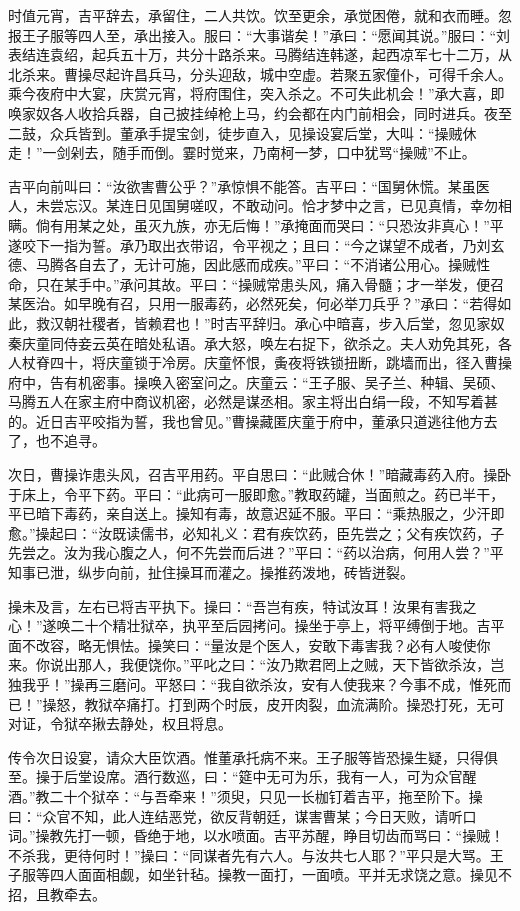 时值元宵，吉平辞去，承留住，二人共饮。饮至更余，承觉困倦，就和衣而睡。忽报王子服等四人至，承出接入。服曰：“大事谐矣！”承曰：“愿闻其说。”服曰：“刘表结连袁绍，起兵五十万，共分十路杀来。马腾结连韩遂，起西凉军七十二万，从北杀来。曹操尽起许昌兵马，分头迎敌，城中空虚。若聚五家僮仆，可得千余人。乘今夜府中大宴，庆赏元宵，将府围住，突入杀之。不可失此机会！”承大喜，即唤家奴各人收拾兵器，自己披挂绰枪上马，约会都在内门前相会，同时进兵。夜至二鼓，众兵皆到。董承手提宝剑，徒步直入，见操设宴后堂，大叫：“操贼休走！”一剑剁去，随手而倒。霎时觉来，乃南柯一梦，口中犹骂“操贼”不止。

吉平向前叫曰：“汝欲害曹公乎？”承惊惧不能答。吉平曰：“国舅休慌。某虽医人，未尝忘汉。某连日见国舅嗟叹，不敢动问。恰才梦中之言，已见真情，幸勿相瞒。倘有用某之处，虽灭九族，亦无后悔！”承掩面而哭曰：“只恐汝非真心！”平遂咬下一指为誓。承乃取出衣带诏，令平视之；且曰：“今之谋望不成者，乃刘玄德、马腾各自去了，无计可施，因此感而成疾。”平曰：“不消诸公用心。操贼性命，只在某手中。”承问其故。平曰：“操贼常患头风，痛入骨髓；才一举发，便召某医治。如早晚有召，只用一服毒药，必然死矣，何必举刀兵乎？”承曰：“若得如此，救汉朝社稷者，皆赖君也！”时吉平辞归。承心中暗喜，步入后堂，忽见家奴秦庆童同侍妾云英在暗处私语。承大怒，唤左右捉下，欲杀之。夫人劝免其死，各人杖脊四十，将庆童锁于冷房。庆童怀恨，夤夜将铁锁扭断，跳墙而出，径入曹操府中，告有机密事。操唤入密室问之。庆童云：“王子服、吴子兰、种辑、吴硕、马腾五人在家主府中商议机密，必然是谋丞相。家主将出白绢一段，不知写着甚的。近日吉平咬指为誓，我也曾见。”曹操藏匿庆童于府中，董承只道逃往他方去了，也不追寻。

次日，曹操诈患头风，召吉平用药。平自思曰：“此贼合休！”暗藏毒药入府。操卧于床上，令平下药。平曰：“此病可一服即愈。”教取药罐，当面煎之。药已半干，平已暗下毒药，亲自送上。操知有毒，故意迟延不服。平曰：“乘热服之，少汗即愈。”操起曰：“汝既读儒书，必知礼义：君有疾饮药，臣先尝之；父有疾饮药，子先尝之。汝为我心腹之人，何不先尝而后进？”平曰：“药以治病，何用人尝？”平知事已泄，纵步向前，扯住操耳而灌之。操推药泼地，砖皆迸裂。

操未及言，左右已将吉平执下。操曰：“吾岂有疾，特试汝耳！汝果有害我之心！”遂唤二十个精壮狱卒，执平至后园拷问。操坐于亭上，将平缚倒于地。吉平面不改容，略无惧怯。操笑曰：“量汝是个医人，安敢下毒害我？必有人唆使你来。你说出那人，我便饶你。”平叱之曰：“汝乃欺君罔上之贼，天下皆欲杀汝，岂独我乎！”操再三磨问。平怒曰：“我自欲杀汝，安有人使我来？今事不成，惟死而已！”操怒，教狱卒痛打。打到两个时辰，皮开肉裂，血流满阶。操恐打死，无可对证，令狱卒揪去静处，权且将息。

传令次日设宴，请众大臣饮酒。惟董承托病不来。王子服等皆恐操生疑，只得俱至。操于后堂设席。酒行数巡，曰：“筵中无可为乐，我有一人，可为众官醒酒。”教二十个狱卒：“与吾牵来！”须臾，只见一长枷钉着吉平，拖至阶下。操曰：“众官不知，此人连结恶党，欲反背朝廷，谋害曹某；今日天败，请听口词。”操教先打一顿，昏绝于地，以水喷面。吉平苏醒，睁目切齿而骂曰：“操贼！不杀我，更待何时！”操曰：“同谋者先有六人。与汝共七人耶？”平只是大骂。王子服等四人面面相觑，如坐针毡。操教一面打，一面喷。平并无求饶之意。操见不招，且教牵去。


